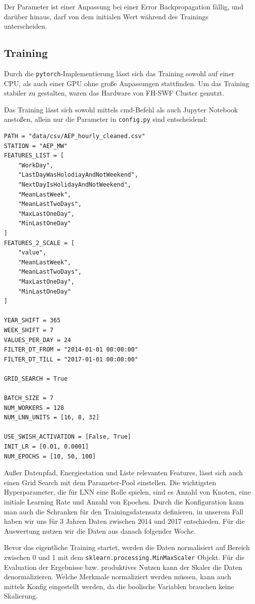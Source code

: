 \documentclass[11pt,ngerman,a4paper,]{article}
\begin{document}
Der Parameter ist einer Anpassung bei einer Error Backpropagation fällig, und darüber hinaus, darf von dem initialen Wert während des Trainings unterscheiden.

\subsection{Training}\label{training}

Durch die \texttt{pytorch}-Implementierung lässt sich das Training sowohl auf einer CPU, als auch einer GPU ohne große Anpassungen stattfinden. Um das Training stabiler zu gestalten, waren das Hardware von FH-SWF Cluster genutzt.

Das Training lässt sich sowohl mittels cmd-Befehl als auch Jupyter Notebook anstoßen, allein nur die Parameter in \texttt{config.py} sind entscheidend:

\begin{verbatim}
PATH = "data/csv/AEP_hourly_cleaned.csv"
STATION = "AEP_MW"
FEATURES_LIST = [
    "WorkDay",
    "LastDayWasHolodiayAndNotWeekend",
    "NextDayIsHolidayAndNotWeekend",
    "MeanLastWeek",
    "MeanLastTwoDays",
    "MaxLastOneDay",
    "MinLastOneDay"
]
FEATURES_2_SCALE = [
    "value",
    "MeanLastWeek",
    "MeanLastTwoDays",
    "MaxLastOneDay",
    "MinLastOneDay"
]

YEAR_SHIFT = 365
WEEK_SHIFT = 7
VALUES_PER_DAY = 24
FILTER_DT_FROM = "2014-01-01 00:00:00"
FILTER_DT_TILL = "2017-01-01 00:00:00"

GRID_SEARCH = True

BATCH_SIZE = 7
NUM_WORKERS = 128
NUM_LNN_UNITS = [16, 8, 32]

USE_SWISH_ACTIVATION = [False, True]
INIT_LR = [0.01, 0.0001]
NUM_EPOCHS = [10, 50, 100]
\end{verbatim}

Außer Datenpfad, Energiestation und Liste relevanten Features, lässt sich auch einen Grid Search mit dem Parameter-Pool einstellen. Die wichtigsten Hyperparameter, die für LNN eine Rolle spielen, sind es Anzahl von Knoten, eine initiale Learning Rate und Anzahl von Epochen. Durch die
Konfiguration kann man auch die Schranken für den Trainingsdatensatz definieren, in unserem Fall haben wir uns für 3 Jahren Daten zwischen 2014 und 2017 entschieden. Für die Auswertung nutzen wir die Daten aus danach folgender Woche.

Bevor das eigentliche Training startet, werden die Daten normalisiert auf Bereich zwischen 0 und 1 mit dem \texttt{sklearn.processing.MinMaxScaler} Objekt. Für die Evaluation der Ergebnisse bzw. produktives Nutzen kann der Skaler die Daten denormalizieren. Welche Merkmale normaliziert werden müssen, kann auch mittels Konfig eingestellt werden, da die boolische Variablen brauchen keine Skalierung.
\end{document}
